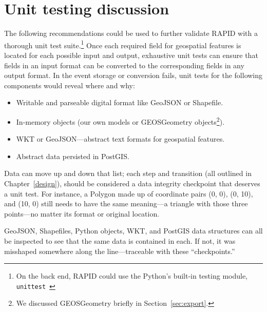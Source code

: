 \section{Unit testing discussion}
The following recommendations could be used to further validate RAPID with a thorough unit test suite.\footnote{On the back end, RAPID could use the Python's built-in testing module, \texttt{unittest}~\cite{DjangoTesting}} Once each required field for geospatial features is located for each possible input and output, exhaustive unit tests can ensure that fields in an input format can be converted to the corresponding fields in any output format. In the event storage or conversion fails, unit tests for the following components would reveal where and why:

\begin{itemize}
\item Writable and parseable digital format like GeoJSON or Shapefile.
\item In-memory objects (our own models or GEOSGeometry objects\footnote{We discussed GEOSGeometry briefly in Section~\ref{sec:export}.}).
\item WKT or GeoJSON---abstract text formats for geospatial features.
\item Abstract data persisted in PostGIS.
\end{itemize}

Data can move up and down that list; each step and transition (all outlined in Chapter~\ref{design}), should be considered a data integrity checkpoint that deserves a unit test. For instance, a Polygon made up of coordinate pairs (0, 0), (0, 10), and (10, 0) still needs to have the same meaning---a triangle with those three points---no matter its format or original location.

GeoJSON, Shapefiles, Python objects, WKT, and PostGIS data structures can all be inspected to see that the same data is contained in each. If not, it was misshaped somewhere along the line---traceable with these ``checkpoints.''